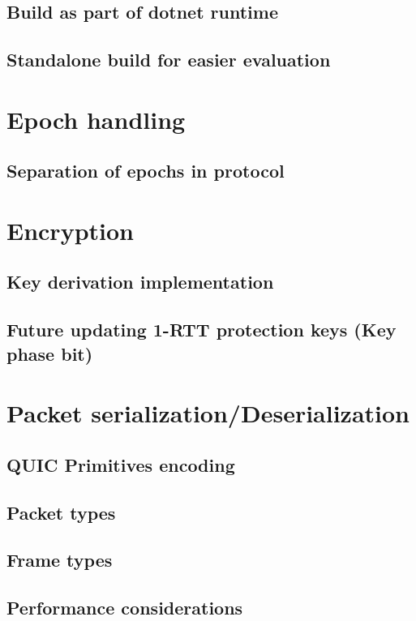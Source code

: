 \subsection{Build as part of dotnet runtime}
\subsection{Standalone build for easier evaluation}


\section{Epoch handling}
\subsection{Separation of epochs in protocol}

\section{Encryption}

\subsection{Key derivation implementation}
\subsection{Future updating 1-RTT protection keys (Key phase bit)}


\section{Packet serialization/Deserialization}

\subsection{QUIC Primitives encoding}
\subsection{Packet types}
\subsection{Frame types}
\subsection{Performance considerations}
